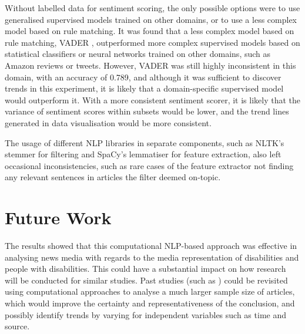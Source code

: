\documentclass{report}
\begin{document}
Without labelled data for sentiment scoring, the only possible options were to use generalised supervised models trained on other domains, or to use a less complex model based on rule matching.
It was found that a less complex model based on rule matching, VADER \cite{VADER}, outperformed more complex supervised models based on statistical classifiers or neural networks trained on other domains, such as Amazon reviews or tweets.
However, VADER was still highly inconsistent in this domain, with an accuracy of 0.789, and although it was sufficient to discover trends in this experiment, it is likely that a domain-specific supervised model would outperform it.
With a more consistent sentiment scorer, it is likely that the variance of sentiment scores within subsets would be lower, and the trend lines generated in data visualisation would be more consistent.

The usage of different NLP libraries in separate components, such as NLTK's stemmer for filtering and SpaCy's lemmatiser for feature extraction, also left occasional inconsistencies, such as rare cases of the feature extractor not finding any relevant sentences in articles the filter deemed on-topic.

\section{Future Work} \label{Future Work}

The results showed that this computational NLP-based approach was effective in analysing news media with regards to the media representation of disabilities and people with disabilities.
This could have a substantial impact on how research will be conducted for similar studies.
Past studies (such as \cite{gold1999media, coverdale2002depictions, jones2009representations, devotta2013representations}) could be revisited using computational approaches to analyse a much larger sample size of articles, which would improve the certainty and representativeness of the conclusion, and possibly identify trends by varying for independent variables such as time and source.
\end{document}

